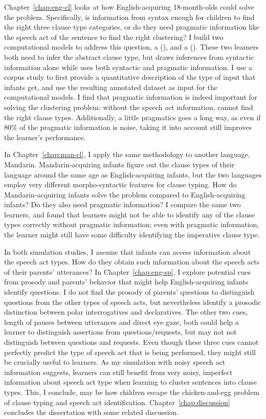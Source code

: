 Chapter~\ref{chap:eng-cl} looks at how English-acquiring 18-month-olds could solve the problem. Specifically, is information from syntax enough for children to find the right three clause type categories, or do they need pragmatic information like the speech act of the sentence to find the right clustering? I build two computational models to address this question, a \distlearner{} (\dlearnerabbr{}), and a \praglearner{} (\plearnerabbr{}). These two learners both need to infer the abstract clause type, but \dlearnerabbr{} draws inferences from syntactic information alone while \plearnerabbr{} uses both syntactic and pragmatic information. I use a corpus study to first provide a quantitative description of the type of input that infants get, and use the resulting annotated dataset as input for the computational models. I find that pragmatic information is indeed important for solving the clustering problem: without the speech act information, \dlearnerabbr{} cannot find the right clause types. Additionally, a little pragmatics goes a long way, as even if 80\% of the pragmatic information is noise, taking it into account still improves the learner's performance. 

In Chapter~\ref{chap:man-cl}, I apply the same methodology to another language, Mandarin. Mandarin-acquiring infants figure out the clause types of their language around the same age as English-acquiring infants, but the two languages employ very different morpho-syntactic features for clause typing. How do Mandarin-acquiring infants solve the problem compared to English-acquiring infants? Do they also need pragmatic information? I compare the same two learners, and found that learners might not be able to identify any of the clause types correctly without pragmatic information; even with pragmatic information, the learner might still have some difficulty identifying the imperative clause type.

In both simulation studies, I assume that infants can access information about the speech act types. How do they obtain such information about the speech acts of their parents' utterances? In Chapter~\ref{chap:eng-sp}, I explore potential cues from prosody and parents' behavior that might help English-acquiring infants identify questions. I do not find the prosody of parents' questions to distinguish questions from the other types of speech acts, but nevertheless identify a prosodic distinction between polar interrogatives and declaratives. The other two cues, length of pauses between utterances and direct eye gaze, both could help a learner to distinguish assertions from questions/requests, but may not not distinguish between questions and requests. Even though these three cues cannot perfectly predict the type of speech act that is being performed, they might still be crucially useful to learners. As my simulation with noisy speech act information suggests, learners can still benefit from very noisy, imperfect information about speech act type when learning to cluster sentences into clause types. This, I conclude, may be how children escape the chicken-and-egg problem of clause typing and speech act identification. Chapter~\ref{chap:discussion} concludes the dissertation with some related discussion.


